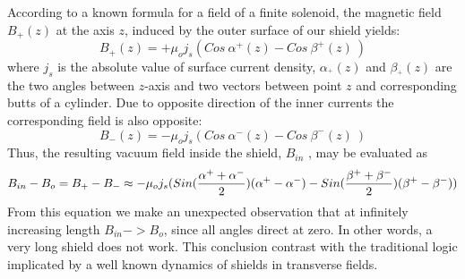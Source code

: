 \documentclass[12pt]{article}
\begin{document}
According  to a  known formula for a field  of a  finite  solenoid, the magnetic field   $B_+(z)$ 
at the axis $z$, induced by the outer surface of our shield  yields:
%
\begin{equation}
 B_{+}(z)=+\mu_o j_s(Cos~\alpha^+(z)-Cos~\beta^+(z)~)
\label{eq31}
\end{equation}
%
where 
$j_s$ is the absolute value of surface current density,
$\alpha_^+(z)$ and $\beta_^+(z)$ are  the two  angles between 
$z$-axis and two  vectors between   point $z$ and corresponding 
butts of a cylinder.
Due to  opposite direction of  the inner currents the corresponding field is also 
opposite:
%
\begin{equation}
B_-(z)=-\mu_o j_s(Cos~\alpha^-(z) - Cos~\beta^-(z)~)
\label{eq32}
\end{equation}
%
Thus, the resulting vacuum field inside the shield, $B_{in}$ , may be evaluated as
%
\begin{equation}
B_{in}-B_o = B_+ - B_-
\approx - \mu_o j_s
\small{(Sin(\frac{\alpha^++\alpha^-}{2})(\alpha^+-\alpha^-)
-Sin(\frac{\beta^++\beta^-}{2})(\beta^+-\beta^-))}
\label{eq1}
\end{equation}
%
From this equation we make an unexpected  observation
that at infinitely increasing length  $B_{in}->B_o$, 
since all angles direct at zero.
In other words, a very long shield does not work. 
This conclusion contrast with the traditional logic implicated by a well known 
dynamics of shields in transverse fields. 
\end{document}
